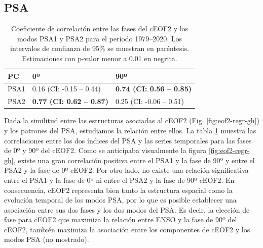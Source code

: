 \documentclass[12pt,oneside,a4paper]{reedthesis}
\begin{document}
\hypertarget{psa}{%
\subsection{PSA}\label{psa}}





\begin{table}

\caption{\label{tab:psa-eof2}Coeficiente de correlación entre las fases del cEOF2 y los modos PSA1 y PSA2 para el período 1979--2020.
Los intervalos de confianza de 95\% se muestran en paréntesis.
Estimaciones con p-valor menor a 0.01 en negrita.}
\centering
\begin{tabular}[t]{l>{}l>{}l}
\toprule
PC & 0º & 90º\\
\midrule
PSA1 & 0.16 (CI: -0.15 -- 0.44) & \textbf{0.74 (CI: 0.56 -- 0.85)}\\
\cmidrule{1-3}
PSA2 & \textbf{0.77 (CI: 0.62 -- 0.87)} & 0.25 (CI: -0.06 -- 0.51)\\
\bottomrule
\end{tabular}
\end{table}

Dada la similitud entre las estructuras asociadas al cEOF2 (Fig. \ref{fig:eof2-regr-gh}) y los patrones del PSA, estudiamos la relación entre ellos.
La tabla \ref{tab:psa-eof2} muestra las correlaciones entre los dos índices del PSA y las series temporales para las fases de 0º y 90º del cEOF2.
Como se anticipaba visualmente la figura \ref{fig:eof2-regr-gh}, existe una gran correlación positiva entre el PSA1 y la fase de 90º y entre el PSA2 y la fase de 0º cEOF2.
Por otro lado, no existe una relación significativa entre el PSA1 y la fase de 0º ni entre el PSA2 y la fase de 90º cEOF2.
En consecuencia, cEOF2 representa bien tanto la estructura espacial como la evolución temporal de los modos PSA, por lo que es posible establecer una asociación entre sus dos fases y los dos modos del PSA.
Es decir, la elección de fase para cEOF2 que maximiza la relación entre ENSO y la fase de 90º del cEOF2, también maximiza la asociación entre los componentes de cEOF2 y los modos PSA (no mostrado).
\end{document}
